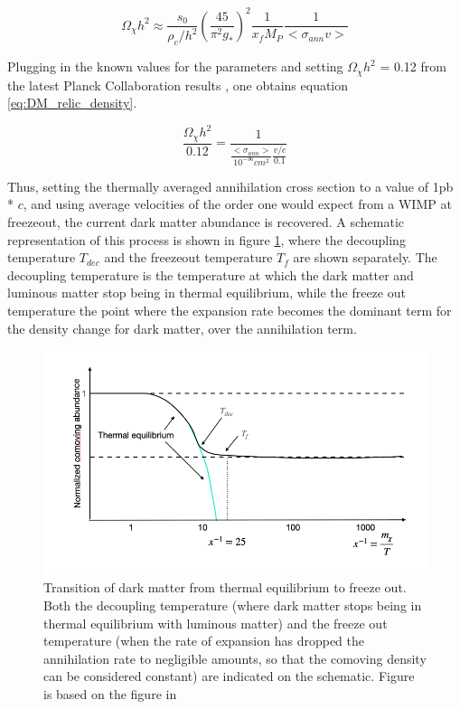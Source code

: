 \begin{equation}
    \label{eq:sol_Boltzmann}
    \Omega_\chi h^2 \approx \frac{s_0}{\rho_c/h^2} \left( \frac{45}{\pi^2g_*}\right)^2 \frac{1}{x_f M_P} \frac{1}{<\sigma_{ann}v>}
\end{equation}

Plugging in the known values for the parameters\cite{ref 533 DM review} and setting $\Omega_\chi h^2$ = 0.12 from the latest Planck Collaboration results \cite{Planck2020}, one obtains equation \ref{eq:DM_relic_density}. 

\begin{equation}
    \label{eq:DM_relic_density}
    \frac{\Omega_\chi h^2}{0.12} = \frac{1}{\frac{<\sigma_{ann}>}{10^{-36} cm^2} \frac{v/c}{0.1}}
\end{equation}

Thus, setting the thermally averaged annihilation cross section to a value of 1pb * $c$, and using average velocities of the order one would expect from a WIMP at freezeout, the current dark matter abundance is recovered. A schematic representation of this process is shown in figure \ref{fig:DM_thremal_eq_freeze_out}, where the decoupling temperature $T_{dec}$ and the freezeout temperature $T_{f}$ are shown separately. The decoupling temperature is the temperature at which the dark matter and luminous matter stop being in thermal equilibrium, while the freeze out temperature the point where the expansion rate becomes the dominant term for the density change for dark matter, over the annihilation term. 

\begin{figure}[h!]
    \centering
    \includegraphics[width=\textwidth]{figures/schematic_thermal_eq_evolution_DM.png}
    \caption{Transition of dark matter from thermal equilibrium to freeze out. Both the decoupling temperature (where dark matter stops being in thermal equilibrium with luminous matter) and the freeze out temperature (when the rate of expansion has dropped the annihilation rate to negligible amounts, so that the comoving density can be considered constant) are indicated on the schematic. Figure is based on the figure in \cite{Baer}}
    \label{fig:DM_thremal_eq_freeze_out}
\end{figure}



